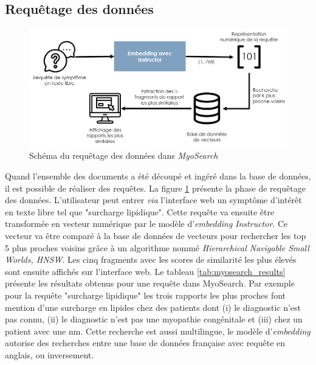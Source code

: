 \subsection{Requêtage des données}
\begin{figure}[!ht]
 \centering
 \includegraphics[width=1\textwidth]{figures/myosearch_query.png}
 \caption[Requêtage des données dans \textit{MyoSearch}]{Schéma du requêtage des données dans \textit{MyoSearch}}
 \label{fig:myosearch_query}
\end{figure}
Quand l'ensemble des documents a été découpé et ingéré dans la base de données, il est possible de réaliser des requêtes. La figure \ref{fig:myosearch_query} présente la phase de requêtage des données. L'utilisateur peut entrer \textit{via} l'interface web un symptôme d'intérêt en texte libre tel que "surcharge lipidique". Cette requête va ensuite être transformée en vecteur numérique par le modèle d'\textit{embedding }\textit{Instructor}. Ce vecteur va être comparé à la base de données de vecteurs pour rechercher les top 5 plus proches voisins grâce à un algorithme nommé \textit{Hierarchical Navigable Small Worlds, HNSW}. Les cinq fragments avec les scores de similarité les plus élevés sont ensuite affichés sur l'interface web. Le tableau \ref{tab:myosearch_results} présente les résultats obtenus pour une requête dans MyoSearch. Par exemple pour la requête "surcharge lipidique" les trois rapports les plus proches font mention d'une surcharge en lipides chez des patients dont (i) le diagnostic n'est pas connu, (ii) le diagnostic n'est pas une myopathie congénitale et (iii) chez un patient avec une \gls{nm}. Cette recherche est aussi multilingue, le modèle d'\textit{embedding} autorise des recherches entre une base de données française avec requête en anglais, ou inversement.
